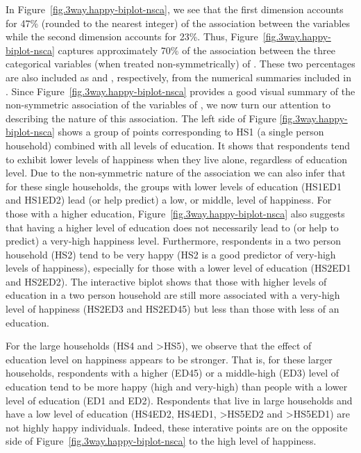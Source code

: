 In Figure~\ref{fig.3way.happy-biplot-nsca}, we see that the first dimension accounts for 47\% (rounded to the nearest integer) of the association  between the variables while the second dimension accounts for 23\%. Thus, Figure~\ref{fig.3way.happy-biplot-nsca} captures approximately 70\% of the association  between the three categorical variables (when treated non-symmetrically) of . These two percentages are also included as  and , respectively, from the numerical summaries included in . Since Figure~\ref{fig.3way.happy-biplot-nsca} provides a good visual summary of the  non-symmetric association of the variables of , we now turn our attention to describing the nature of this association. 
The left side of Figure \ref{fig.3way.happy-biplot-nsca} shows a group of points corresponding to HS1 (a single person household) combined with all levels of education. It shows that respondents tend to exhibit lower levels of happiness when they live alone, regardless of education level. Due to the non-symmetric nature of the association we can also infer that for these single households, the groups with lower levels of education ({HS1ED1} and {HS1ED2}) lead (or help predict) a low, or middle, level of happiness. For those with a higher education, Figure~\ref{fig.3way.happy-biplot-nsca} also suggests that having a higher level of education does not necessarily lead to (or help to predict) a very-high happiness level. Furthermore, respondents in a two person household ({HS2}) tend to be very happy (HS2 is a good predictor of {very-high} levels of happiness), especially for those with a lower level of education ({HS2ED1} and {HS2ED2}). The interactive biplot shows that those with higher levels of education in a two person household are still more associated with a {very-high} level of happiness ({HS2ED3} and {HS2ED45}) but less  than those with less of an education. 

For the large households ({HS4} and {>HS5}), we observe that the effect of education level on happiness appears to be stronger. That is, for these larger households, respondents with a higher ({ED45}) or a middle-high ({ED3}) level of education tend to be more happy ({high} and {very-high}) than people with a lower level of education  ({ED1} and {ED2}). Respondents that live in large households and have a low level of education ({HS4ED2}, {HS4ED1}, {>HS5ED2} and {>HS5ED1}) are not highly happy individuals. Indeed, these interative points are on the opposite side of Figure~\ref{fig.3way.happy-biplot-nsca} to the {high} level of happiness.


